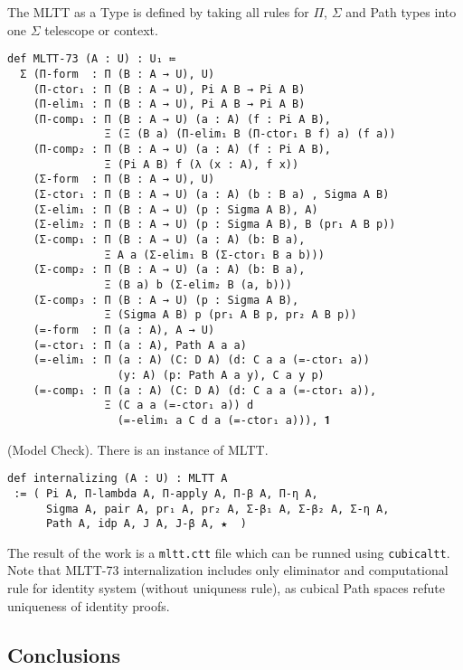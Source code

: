 \documentclass{article}
\begin{document}
\begin{definition}
The MLTT as a Type is defined by taking all rules
for $\Pi$, $\Sigma$ and Path types into one $\Sigma$ telescope or context.
\begin{lstlisting}[mathescape=true]
def MLTT-73 (A : U) : U₁ ≔
  Σ (Π-form  : Π (B : A → U), U)
    (Π-ctor₁ : Π (B : A → U), Pi A B → Pi A B)
    (Π-elim₁ : Π (B : A → U), Pi A B → Pi A B)
    (Π-comp₁ : Π (B : A → U) (a : A) (f : Pi A B),
               Ξ (Ξ (B a) (Π-elim₁ B (Π-ctor₁ B f) a) (f a))
    (Π-comp₂ : Π (B : A → U) (a : A) (f : Pi A B),
               Ξ (Pi A B) f (λ (x : A), f x))
    (Σ-form  : Π (B : A → U), U)
    (Σ-ctor₁ : Π (B : A → U) (a : A) (b : B a) , Sigma A B)
    (Σ-elim₁ : Π (B : A → U) (p : Sigma A B), A)
    (Σ-elim₂ : Π (B : A → U) (p : Sigma A B), B (pr₁ A B p))
    (Σ-comp₁ : Π (B : A → U) (a : A) (b: B a),
               Ξ A a (Σ-elim₁ B (Σ-ctor₁ B a b)))
    (Σ-comp₂ : Π (B : A → U) (a : A) (b: B a),
               Ξ (B a) b (Σ-elim₂ B (a, b)))
    (Σ-comp₃ : Π (B : A → U) (p : Sigma A B),
               Ξ (Sigma A B) p (pr₁ A B p, pr₂ A B p))
    (=-form  : Π (a : A), A → U)
    (=-ctor₁ : Π (a : A), Path A a a)
    (=-elim₁ : Π (a : A) (C: D A) (d: C a a (=-ctor₁ a))
                 (y: A) (p: Path A a y), C a y p)
    (=-comp₁ : Π (a : A) (C: D A) (d: C a a (=-ctor₁ a)),
               Ξ (C a a (=-ctor₁ a)) d
                 (=-elim₁ a C d a (=-ctor₁ a))), 𝟏
\end{lstlisting}
\end{definition}

\begin{theorem} (Model Check).
There is an instance of MLTT.
\begin{lstlisting}
def internalizing (A : U) : MLTT A
 := ( Pi A, Π-lambda A, Π-apply A, Π-β A, Π-η A,
      Sigma A, pair A, pr₁ A, pr₂ A, Σ-β₁ A, Σ-β₂ A, Σ-η A,
      Path A, idp A, J A, J-β A, ★  )
\end{lstlisting}
\end{theorem}

The result of the work is a \texttt{mltt.ctt} file which can be runned using \texttt{cubicaltt}.
Note that MLTT-73 internalization includes only eliminator and computational rule for identity
system (without uniquness rule), as cubical Path spaces refute uniqueness of identity proofs.

\subsection*{Conclusions}
\end{document}
